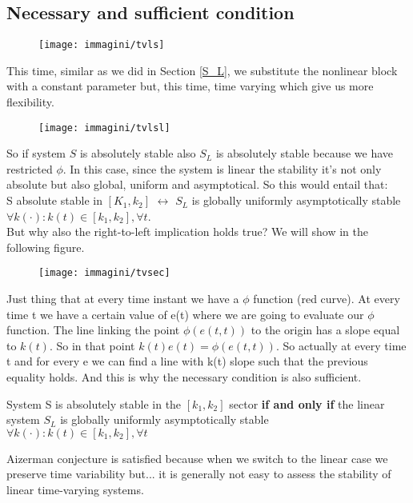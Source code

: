 \subsection{Necessary and sufficient condition}
\begin{figure}[H]
	\centering
	\texttt{[image: immagini/tvls]}
	\label{fig:tvls}
\end{figure}
This time, similar as we did in Section \ref{S_L}, we substitute the nonlinear block with a constant parameter but, this time, time varying which give us more flexibility.
\begin{figure}[H]
	\centering
	\texttt{[image: immagini/tvlsl]}
	\label{fig:tvlsl}
\end{figure}
So if system $S$ is absolutely stable also $S_L$ is absolutely stable because we have restricted $\phi$. In this case, since the system is linear the stability it's not only absolute but also global, uniform and asymptotical. So this would entail that:\\
S absolute stable in $[K_1,k_2]$ $\leftrightarrow$ $S_L$ is globally uniformly asymptotically stable $\forall k(\cdot)\colon k(t) \in [k_1,k_2], \forall t$.\\But why also the right-to-left implication holds true? We will show in  the following figure.
\begin{figure}[H]
	\centering
	\texttt{[image: immagini/tvsec]}
	\label{fig:tvsec}
\end{figure}
Just thing that at every time instant we have a $\phi$ function (red curve). At every time t we have a certain value of e(t) where we are going to evaluate our $\phi$ function. The line linking the point $\phi(e(t,t))$ to the origin has a slope equal to $k(t)$. So in that point $k(t)e(t)=\phi(e(t,t))$. So actually at every time t and for every e we can find a line with k(t) slope such that the previous equality holds. And this is why the necessary condition is also sufficient.
\begin{thm}
	System S is absolutely stable in the $[k_1, k_2]$ sector \textbf{if and only if} the linear system $S_L$ is globally uniformly asymptotically stable $\forall k(\cdot)\colon k(t) \in [k_1,k_2], \forall t$
\end{thm}
\begin{note}
	Aizerman conjecture is satisfied because when we switch to the linear case we preserve time variability but... it is generally not easy to assess the stability of linear time-varying systems.
\end{note}
